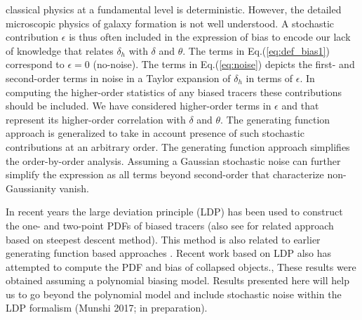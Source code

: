 classical physics at a fundamental level is deterministic. However, the detailed microscopic physics of 
galaxy formation is not well understood. A stochastic contribution $\epsilon$ is 
thus often included in the expression of bias to encode our lack of knowledge that relates $\delta_h$ with $\delta$ and $\theta$.
The terms in Eq.(\ref{eq:def_bias1}) correspond to  $\epsilon=0$ (no-noise). The terms in Eq.(\ref{eq:noise}) depicts the
first- and second-order terms in noise in a Taylor expansion of $\delta_h$ in terms of $\epsilon$.
In computing the higher-order statistics of any biased tracers these contributions
should be included. We have considered higher-order terms in $\epsilon$ and that represent its higher-order correlation with
$\delta$ and $\theta$. The generating function
approach is generalized to take in account presence of such stochastic contributions at an arbitrary order.
The generating function approach simplifies the order-by-order analysis.
Assuming a Gaussian stochastic noise can further simplify the expression as all terms beyond
second-order that characterize non-Gaussianity vanish. 

In recent years the large deviation principle (LDP) has been used to construct the one- and two-point 
PDFs of biased tracers \citep{Cora1,Cora2,Cora3} (also see \citep{valageas} for related approach based on steepest descent method).
This method is also related  to earlier generating function based approaches \citep{Ber92,Ber94,francis}.
Recent work based on LDP also has attempted to compute the PDF and bias of collapsed objects.,
These results were obtained assuming a polynomial biasing model.
Results presented here will help us to go beyond the polynomial model and include 
stochastic noise within the LDP formalism (Munshi 2017; in preparation).
%
  